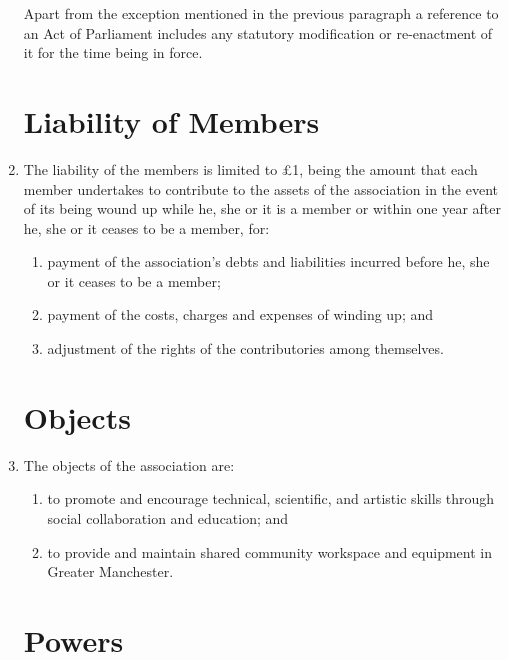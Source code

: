 \begin{enumerate}
  Apart from the exception mentioned in the previous paragraph a
  reference to an Act of Parliament includes any statutory
  modification or re-enactment of it for the time being in force.

\section{Liability of Members}

\item
  The liability of the members is limited to £1, being the amount that
  each member undertakes to contribute to the assets of the association
  in the event of its being wound up while he, she or it is a member or
  within one year after he, she or it ceases to be a member, for:
  \begin{enumerate}
  \item
    payment of the association's debts and liabilities incurred before he,
    she or it ceases to be a member;
  \item
    payment of the costs, charges and expenses of winding up; and
  \item
    adjustment of the rights of the contributories among themselves.
  \end{enumerate}

\section{Objects}

\item
  The objects of the association are:
  \begin{enumerate}
  \item
    to promote and encourage technical, scientific, and artistic skills through social collaboration and education; and
  \item
    to provide and maintain shared community workspace and equipment in Greater Manchester.
  \end{enumerate}

\section{Powers}


\end{enumerate}
